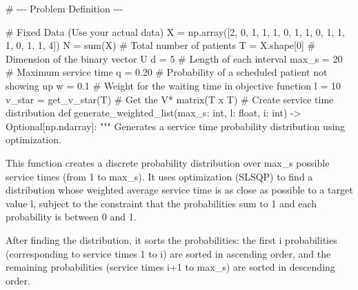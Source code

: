 \documentclass[
  letterpaper,
  DIV=11,
  numbers=noendperiod]{scrartcl}
\newenvironment{Shaded}{\begin{snugshade}}{\end{snugshade}}
\newcommand{\BuiltInTok}[1]{\textcolor[rgb]{0.00,0.23,0.31}{#1}}
\newcommand{\CommentTok}[1]{\textcolor[rgb]{0.37,0.37,0.37}{#1}}
\newcommand{\DecValTok}[1]{\textcolor[rgb]{0.68,0.00,0.00}{#1}}
\newcommand{\FloatTok}[1]{\textcolor[rgb]{0.68,0.00,0.00}{#1}}
\newcommand{\KeywordTok}[1]{\textcolor[rgb]{0.00,0.23,0.31}{#1}}
\newcommand{\NormalTok}[1]{\textcolor[rgb]{0.00,0.23,0.31}{#1}}
\newcommand{\OperatorTok}[1]{\textcolor[rgb]{0.37,0.37,0.37}{#1}}
\begin{document}
\begin{Shaded}
\begin{Highlighting}[]
\CommentTok{\# {-}{-}{-} Problem Definition {-}{-}{-}}

\CommentTok{\# Fixed Data (Use your actual data)}
\NormalTok{X }\OperatorTok{=}\NormalTok{ np.array([}\DecValTok{2}\NormalTok{, }\DecValTok{0}\NormalTok{, }\DecValTok{1}\NormalTok{, }\DecValTok{1}\NormalTok{, }\DecValTok{1}\NormalTok{, }\DecValTok{0}\NormalTok{, }\DecValTok{1}\NormalTok{, }\DecValTok{1}\NormalTok{, }\DecValTok{0}\NormalTok{, }\DecValTok{1}\NormalTok{, }\DecValTok{1}\NormalTok{, }\DecValTok{1}\NormalTok{, }\DecValTok{0}\NormalTok{, }\DecValTok{1}\NormalTok{, }\DecValTok{1}\NormalTok{, }\DecValTok{4}\NormalTok{])}
\NormalTok{N }\OperatorTok{=} \BuiltInTok{sum}\NormalTok{(X) }\CommentTok{\# Total number of patients}
\NormalTok{T }\OperatorTok{=}\NormalTok{ X.shape[}\DecValTok{0}\NormalTok{] }\CommentTok{\# Dimension of the binary vector U}
\NormalTok{d }\OperatorTok{=} \DecValTok{5} \CommentTok{\# Length of each interval}
\NormalTok{max\_s }\OperatorTok{=} \DecValTok{20} \CommentTok{\# Maximum service time}
\NormalTok{q }\OperatorTok{=} \FloatTok{0.20} \CommentTok{\# Probability of a scheduled patient not showing up}
\NormalTok{w }\OperatorTok{=} \FloatTok{0.1} \CommentTok{\# Weight for the waiting time in objective function}
\NormalTok{l }\OperatorTok{=} \DecValTok{10}
\NormalTok{v\_star }\OperatorTok{=}\NormalTok{ get\_v\_star(T) }\CommentTok{\# Get the V* matrix(T x T)}
\CommentTok{\# Create service time distribution}
\KeywordTok{def}\NormalTok{ generate\_weighted\_list(max\_s: }\BuiltInTok{int}\NormalTok{, l: }\BuiltInTok{float}\NormalTok{, i: }\BuiltInTok{int}\NormalTok{) }\OperatorTok{{-}\textgreater{}}\NormalTok{ Optional[np.ndarray]:}
    \CommentTok{"""}
\CommentTok{    Generates a service time probability distribution using optimization.}

\CommentTok{    This function creates a discrete probability distribution over max\_s possible}
\CommentTok{    service times (from 1 to max\_s). It uses optimization (SLSQP) to find a}
\CommentTok{    distribution whose weighted average service time is as close as possible}
\CommentTok{    to a target value \textquotesingle{}l\textquotesingle{}, subject to the constraint that the probabilities}
\CommentTok{    sum to 1 and each probability is between 0 and 1.}

\CommentTok{    After finding the distribution, it sorts the probabilities: the first \textquotesingle{}i\textquotesingle{}}
\CommentTok{    probabilities (corresponding to service times 1 to i) are sorted in}
\CommentTok{    ascending order, and the remaining probabilities (service times i+1 to max\_s)}
\CommentTok{    are sorted in descending order.}


\end{Highlighting}
\end{Shaded}
\end{document}
